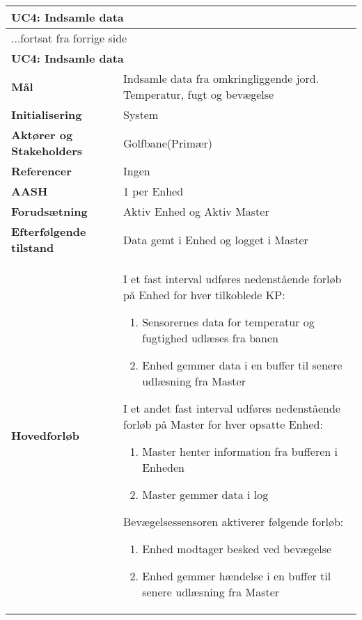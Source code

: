\begin{center} \centering \label{UC4}
	\begin{longtable}{|p{5cm}|p{9cm}|}  %
	\hline
		\multicolumn{2}{|l|}{\textbf{UC4: Indsamle data}} \\\hline %
		\endfirsthead
		
		\multicolumn{2}{l}{...fortsat fra forrige side} \\ \hline %
		\multicolumn{2}{|l|}{\textbf{UC4: Indsamle data}} \\\hline %
		\endhead	
		
		\textbf{Mål}								&Indsamle data fra omkringliggende jord. Temperatur, fugt og bevægelse			\\\hline
		\textbf{Initialisering}					&System				\\\hline
		\textbf{Aktører og Stakeholders}			&Golfbane(Primær)	\\\hline
		\textbf{Referencer}						&Ingen				\\\hline
		\textbf{AASH}							&1 per Enhed			\\\hline
		\textbf{Forudsætning}					&Aktiv Enhed og Aktiv Master			\\\hline
		\textbf{Efterfølgende tilstand}			&Data gemt i Enhed og logget i Master 	\\\hline
		\textbf{Hovedforløb}					
			&I et fast interval udføres nedenstående forløb på Enhed for hver tilkoblede KP:
			\begin{enumerate}
			
				\item Sensorernes data for temperatur og fugtighed udlæses fra banen
				
				\item Enhed gemmer data i en buffer til senere udlæsning fra Master				
			
			\end{enumerate}
			
			
			I et andet fast interval udføres nedenstående forløb på Master for hver opsatte Enhed:
			\begin{enumerate}
			
				\item Master henter information fra bufferen i Enheden
				
				\item Master gemmer data i log
			\end{enumerate}
			
			
			 Bevægelsessensoren aktiverer følgende forløb:
			\begin{enumerate}
			
				\item Enhed modtager besked ved bevægelse 
				
				\item Enhed gemmer hændelse i en buffer til senere udlæsning fra Master 
				
			\end{enumerate}

				\\\hline
	\end{longtable}
\end{center}

